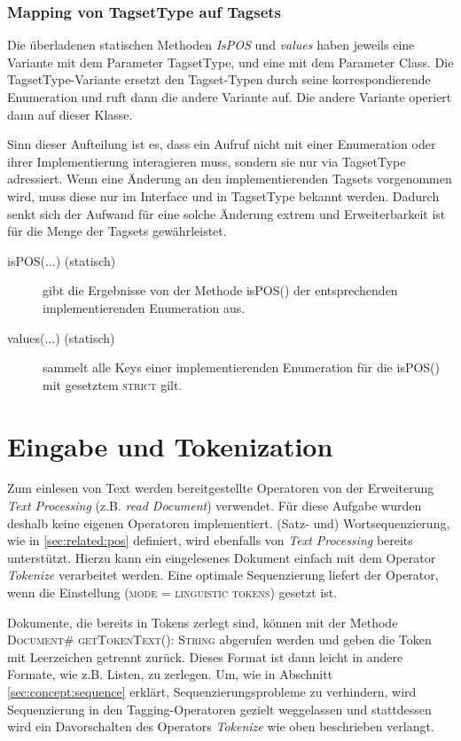 \subsubsection{Mapping von TagsetType auf Tagsets}

Die überladenen statischen Methoden \textit{IsPOS} und \textit{values} haben jeweils eine Variante mit dem Parameter TagsetType, und eine mit dem Parameter Class. Die TagsetType-Variante ersetzt den Tagset-Typen durch seine korrespondierende Enumeration und ruft dann die andere Variante auf. Die andere Variante operiert dann auf dieser Klasse.

Sinn dieser Aufteilung ist es, dass ein Aufruf nicht mit einer Enumeration oder ihrer Implementierung interagieren muss, sondern sie nur via TagsetType adressiert. Wenn eine Änderung an den implementierenden Tagsets vorgenommen wird, muss diese nur im Interface und in TagsetType bekannt werden. Dadurch senkt sich der Aufwand für eine solche Änderung extrem und Erweiterbarkeit ist für die Menge der Tagsets gewährleistet.

\begin{description}
\item[isPOS(...) (statisch)] gibt die Ergebnisse von der Methode isPOS() der entsprechenden implementierenden Enumeration aus.
\item[values(...) (statisch)] sammelt alle Keys einer implementierenden Enumeration für die isPOS() mit gesetztem \textsc{strict} gilt.
\end{description}

\section{Eingabe und Tokenization}
Zum einlesen von Text werden bereitgestellte Operatoren von der Erweiterung \textit{Text Processing} (z.B. \textit{read Document}) verwendet. Für diese Aufgabe wurden deshalb keine eigenen Operatoren implementiert. (Satz- und) Wortsequenzierung, wie in \ref{sec:related:pos} definiert, wird ebenfalls von \textit{Text Processing} bereits unterstützt. Hierzu kann ein eingelesenes Dokument einfach mit dem Operator \textit{Tokenize} verarbeitet werden. Eine optimale Sequenzierung liefert der Operator, wenn die Einstellung \textsc{(mode = linguistic tokens)} gesetzt ist.

 Dokumente, die bereits in Tokens zerlegt sind, können mit der Methode \textsc{Document\# getTokenText(): String} abgerufen werden und geben die Token mit Leerzeichen getrennt zurück. Dieses Format ist dann leicht in andere Formate, wie z.B. Listen, zu zerlegen. Um, wie in Abschnitt \ref{sec:concept:sequence} erklärt, Sequenzierungsprobleme zu verhindern, wird Sequenzierung in den Tagging-Operatoren gezielt weggelassen und stattdessen wird ein Davorschalten des Operators \textit{Tokenize} wie oben beschrieben verlangt.

